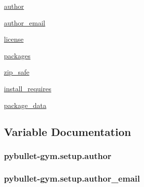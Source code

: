\begin{DoxyCompactItemize}
\hyperlink{namespacepybullet-gym_1_1setup_a875d60d2ace5c2d3e7f79814bb376daf}{author}
\item 
\hyperlink{namespacepybullet-gym_1_1setup_ad43e19dc1dcda037646c182c24c0e7cb}{author\+\_\+email}
\item 
\hyperlink{namespacepybullet-gym_1_1setup_ad41c57561d336cfa9807108f8ce237b2}{license}
\item 
\hyperlink{namespacepybullet-gym_1_1setup_ac64fbb4020665cf11ce8a81e800d26ca}{packages}
\item 
\hyperlink{namespacepybullet-gym_1_1setup_a3bf7f27f84154ed1471705270b9ec082}{zip\+\_\+safe}
\item 
\hyperlink{namespacepybullet-gym_1_1setup_a62086f7863468f737ebf22128e392593}{install\+\_\+requires}
\item 
\hyperlink{namespacepybullet-gym_1_1setup_a187400dfdb32a010447de8771201bd8b}{package\+\_\+data}
\end{DoxyCompactItemize}


\subsection{Variable Documentation}
\subsubsection[{\texorpdfstring{author}{author}}]{\setlength{\rightskip}{0pt plus 5cm}pybullet-\/gym.\+setup.\+author}\hypertarget{namespacepybullet-gym_1_1setup_a875d60d2ace5c2d3e7f79814bb376daf}{}\label{namespacepybullet-gym_1_1setup_a875d60d2ace5c2d3e7f79814bb376daf}
\subsubsection[{\texorpdfstring{author\+\_\+email}{author_email}}]{\setlength{\rightskip}{0pt plus 5cm}pybullet-\/gym.\+setup.\+author\+\_\+email}\hypertarget{namespacepybullet-gym_1_1setup_ad43e19dc1dcda037646c182c24c0e7cb}{}\label{namespacepybullet-gym_1_1setup_ad43e19dc1dcda037646c182c24c0e7cb}

